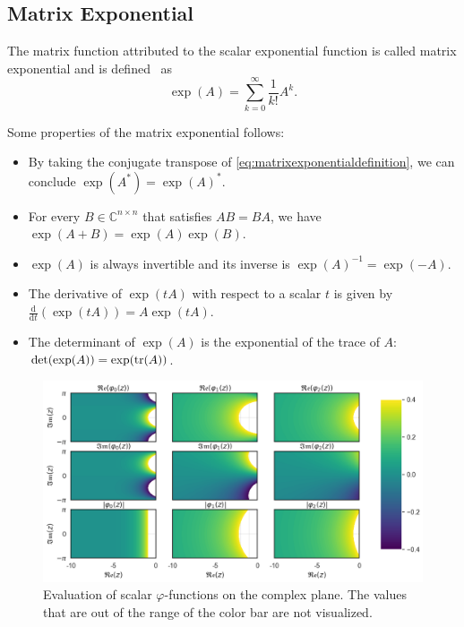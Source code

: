 \subsection{Matrix Exponential}
The matrix function attributed to the scalar exponential function is called
matrix exponential and is defined~\cite{higham2008functions} as
\begin{equation}
    \label{eq:matrixexponentialdefinition}
    \exp(A) = \sum_{k=0}^{\infty}{\frac{1}{k!} A^k}.
\end{equation}

Some properties of the matrix exponential follows:
\begin{itemize}
    \item By taking the conjugate transpose of \eqref{eq:matrixexponentialdefinition},
        we can conclude $\exp(A^{*}) = \exp(A)^{*}$.
    \item For every $B \in \mathbb{C}^{n \times n}$ that satisfies $AB = BA$,
        we have $\exp(A + B) = \exp(A) \exp(B)$.
    \item $\exp(A)$ is always invertible and its inverse is $\exp(A)^{-1} = \exp(-A)$.
    \item The derivative of $\exp(tA)$ with respect to a scalar $t$ is given by
        $\frac{\mathrm{d}}{\mathrm{d} t} (\exp(tA)) = A \exp(tA)$.
    \item The determinant of $\exp(A)$ is the exponential of the trace of
        $A$: $\det(\exp(A)) = \exp(\trace(A))$.
\end{itemize}

\begin{figure}[h]
    \centering
    \includegraphics[width=.7\textwidth]{img/scalarcomplexplane.png}
    \caption{
        Evaluation of scalar $\varphi$-functions on the complex plane.
        The values that are out of the range of the color bar are not visualized.
        }
    \label{fig:scalarphifunctionscomplexplane}
\end{figure}


